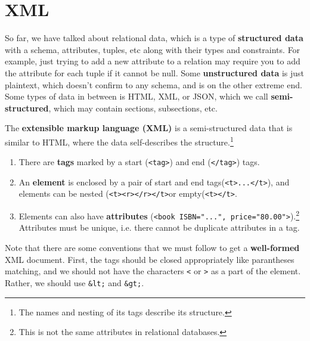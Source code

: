\section{XML} 

  So far, we have talked about relational data, which is a type of \textbf{structured data} with a schema, attributes, tuples, etc along with their types and constraints. For example, just trying to add a new attribute to a relation may require you to add the attribute for each tuple if it cannot be null. Some \textbf{unstructured data} is just plaintext, which doesn't confirm to any schema, and is on the other extreme end. Some types of data in between is HTML, XML, or JSON, which we call \textbf{semi-structured}, which may contain sections, subsections, etc. 

  \begin{definition}[XML]
    \label{def:xml}
    The \textbf{extensible markup language (XML)} is a semi-structured data that is similar to HTML, where the data self-describes the structure.\footnote{The names and nesting of its tags describe its structure.} 
    \begin{enumerate}
      \item There are \textbf{tags} marked by a start (\texttt{<tag>}) and end (\texttt{</tag>}) tags. 
      \item An \textbf{element} is enclosed by a pair of start and end tags(\texttt{<t>...</t>}), and elements can be nested (\texttt{<t><r></r></t>}or empty(\texttt{<t></t>}.  
      \item Elements can also have \textbf{attributes} (\texttt{<book ISBN="...", price="80.00">}).\footnote{This is not the same attributes in relational databases.} Attributes must be unique, i.e. there cannot be duplicate attributes in a tag. 
    \end{enumerate}
    Note that there are some conventions that we must follow to get a \textbf{well-formed} XML document. First, the tags should be closed appropriately like parantheses matching, and we should not have the characters \texttt{<} or \texttt{>} as a part of the element. Rather, we should use \texttt{\&lt;} and \texttt{\&gt;}. 
  \end{definition}

